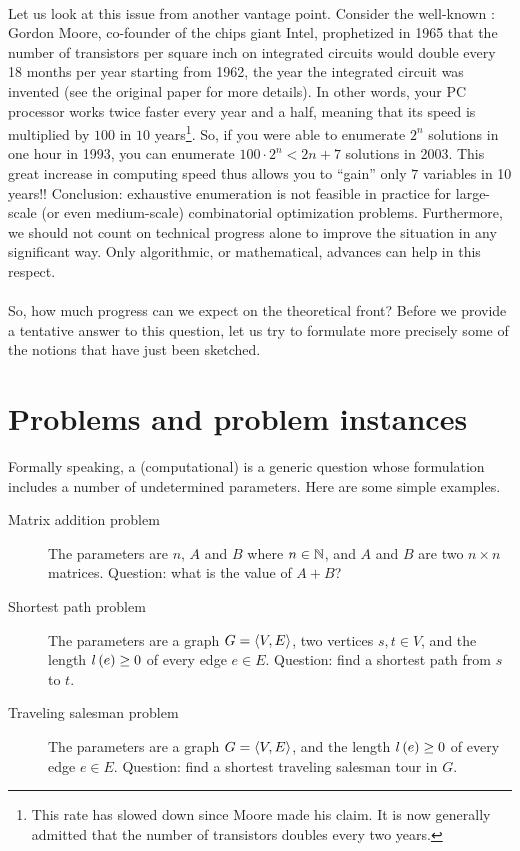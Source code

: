 \paragraph{}
Let us look at this issue from another vantage point. Consider the well-known : Gordon Moore, co-founder of the chips giant Intel, prophetized in 1965 that the number of transistors per square inch on integrated circuits would double every 18 months per year starting from 1962, the year the integrated circuit was invented (see the original paper for more details). In other words, your PC processor works twice faster every year and a half, meaning that its speed is multiplied by $100$ in $10$ years\footnote{This rate has slowed down since Moore made his claim. It is now generally admitted that the number of transistors doubles every two years.}. So, if you were able to enumerate $2^n$ solutions in one hour in 1993, you can enumerate $100\cdot2^n<2{n+7}$ solutions in 2003. This great increase in computing speed thus allows you to ``gain'' only $7$ variables in 10 years!! Conclusion: exhaustive enumeration is not feasible in practice for large-scale (or even medium-scale) combinatorial optimization problems. Furthermore, we should not count on technical progress alone to improve the situation in any significant way. Only algorithmic, or mathematical, advances can help in this respect.

\paragraph{}
So, how much progress can we expect on the theoretical front? Before we provide a tentative answer to this question, let us try to formulate more precisely some of the notions that have just been sketched.

\section{Problems and problem instances}
Formally speaking, a (computational)  is a generic question whose formulation includes a number of undetermined parameters. Here are some simple examples.

\begin{description}
 \item[Matrix addition problem] The parameters are $n$, $A$ and $B$ where $n\in\mathbb{N}$, and $A$ and $B$ are two $n\times n$ matrices. Question: what is the value of $A+B$?
 \item[Shortest path problem] The parameters are a graph $G=\left\langle V,E \right\rangle$, two vertices $s,t\in V$, and the length $l\left( e \right)\geq 0$ of every edge $e\in E$. Question: find a shortest path from $s$ to $t$.
 \item[Traveling salesman problem] The parameters are a graph $G=\left\langle V,E \right\rangle$, and the length $l\left( e \right)\geq 0$ of every edge $e\in E$. Question: find a shortest traveling salesman tour in $G$.
\end{description}


